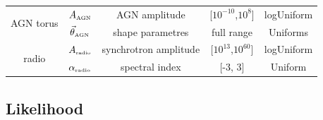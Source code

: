 \begin{table}
\begin{tabular}{ccccc}
    \hline
    \multirow{2}{4em}{AGN torus } & $A_{\mbox{\tiny{AGN}}}$ & AGN amplitude & [$10^{-10}$,$10^8$] & logUniform \\ 
                                & $\vec{\theta}_{\mbox{\tiny{AGN}}} $ &  shape parametres & full range & Uniforms \\ 
    \hline
    \multirow{2}{4em}{radio } & $A_{\mbox{\tiny{radio}}}$ & synchrotron amplitude & [$10^{13}$,$10^{60}$] & logUniform \\ 
                                & $\alpha_{\mbox{\tiny{radio}}}$ &  spectral index & [-3, 3] & Uniform \\ 
    \hline
    \hline
    \end{tabular}  
    \label{tab:ParamSpace}
\end{table}
\subsection{Likelihood}\label{sec:Likeli}

